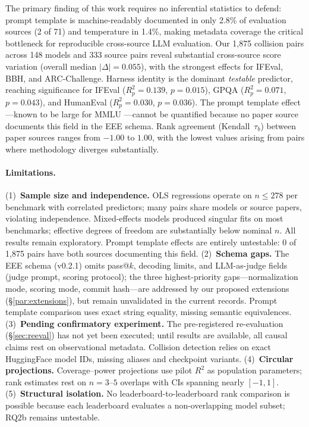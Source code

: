 \documentclass[11pt]{article}
\begin{document}
The primary finding of this work requires no inferential statistics to
defend: prompt template is machine-readably documented in only 2.8\% of
evaluation sources (2 of 71) and temperature in 1.4\%, making metadata
coverage the critical bottleneck for reproducible cross-source LLM evaluation.
Our 1,875 collision pairs across 148 models and 333 source pairs reveal
substantial cross-source score variation (overall median $|\Delta| = 0.055$),
with the strongest effects for IFEval, BBH, and ARC-Challenge.
Harness identity is the dominant \emph{testable} predictor, reaching
significance for IFEval ($R^2_p = 0.139$, $p = 0.015$), GPQA
($R^2_p = 0.071$, $p = 0.043$), and HumanEval ($R^2_p = 0.030$, $p = 0.036$).
The prompt template effect---known to be large for MMLU
\citep{alzahrani-2024-benchmarks}---cannot be quantified because
no paper source documents this field in the EEE schema.
Rank agreement (Kendall~$\tau_b$) between paper sources ranges from $-1.00$
to $1.00$, with the lowest values arising from pairs where
methodology diverges substantially.

\paragraph{Limitations.}
(1)~\textbf{Sample size and independence.}
OLS regressions operate on $n \leq 278$ per benchmark with correlated
predictors; many pairs share models or source papers, violating independence.
Mixed-effects models produced singular fits on most benchmarks;
effective degrees of freedom are substantially below nominal $n$.
All results remain exploratory.
Prompt template effects are entirely untestable: 0 of 1,875 pairs
have both sources documenting this field.
(2)~\textbf{Schema gaps.}
The EEE schema (v0.2.1) omits pass@$k$, decoding limits, and
LLM-as-judge fields (judge prompt, scoring protocol); the
three highest-priority gaps---normalization mode, scoring mode,
commit hash---are addressed by our proposed extensions
(\S\ref{par:extensions}), but remain unvalidated in the current
records. Prompt template comparison uses exact string equality,
missing semantic equivalences.
(3)~\textbf{Pending confirmatory experiment.}
The pre-registered re-evaluation (\S\ref{sec:reeval}) has not
yet been executed; until results are available, all causal claims
rest on observational metadata. Collision detection relies on
exact HuggingFace model IDs, missing aliases and checkpoint variants.
(4)~\textbf{Circular projections.}
Coverage--power projections use pilot $R^2$ as population parameters;
rank estimates rest on $n = 3$--$5$ overlaps with CIs spanning nearly
$[-1, 1]$.
(5)~\textbf{Structural isolation.}
No leaderboard-to-leaderboard rank comparison is possible because each
leaderboard evaluates a non-overlapping model subset; RQ2b remains
untestable.
\end{document}
